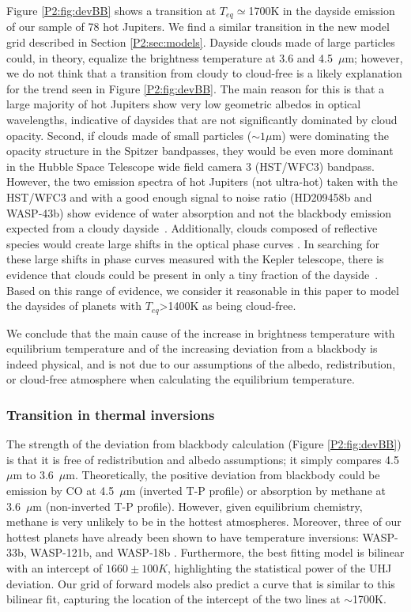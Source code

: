 Figure \ref{P2:fig:devBB} shows a transition at $T_{eq}\simeq$1700K in the dayside emission of our sample of 78 hot Jupiters. We find a similar transition in the new model grid described in Section \ref{P2:sec:models}. Dayside clouds made of large particles could, in theory, equalize the brightness temperature at 3.6 and 4.5~$\mu$m; however, we do not think that a transition from cloudy to cloud-free  is a likely explanation for the trend seen in Figure \ref{P2:fig:devBB}. The main reason for this is that a large majority of hot Jupiters show very low geometric albedos in optical wavelengths, indicative of daysides that are not significantly dominated by cloud opacity. Second, if clouds made of small particles ($\sim1\mu$m) were dominating the opacity structure in the Spitzer bandpasses, they would be even more dominant in the Hubble Space Telescope wide field camera 3 (HST/WFC3) bandpass. However, the two emission spectra of hot Jupiters (not ultra-hot) taken with the HST/WFC3 and with a good enough signal to noise ratio (HD209458b and WASP-43b) show evidence of water absorption and not the blackbody emission  expected from a cloudy dayside~\citep{Line2016, Stevenson2014b}. Additionally, clouds composed of reflective species would create large shifts in the optical phase curves \citet{Shporer2015}. In searching for these large shifts in phase curves measured with the Kepler telescope, there is evidence that clouds could be present in only a tiny fraction of the dayside~\citep{Parmentier2016}. Based on this range of evidence, we consider it reasonable in this paper to model the daysides of planets with $T_{eq}$>1400K as being
cloud-free.%

We conclude that the main cause of the increase in brightness temperature with equilibrium temperature and of the increasing deviation from a blackbody is indeed physical, and is not due to our assumptions of the albedo, redistribution, or cloud-free atmosphere when calculating the equilibrium temperature.

\subsubsection{Transition in thermal inversions}

The strength of the deviation from blackbody calculation (Figure \ref{P2:fig:devBB}) is that it is free of redistribution and albedo assumptions; it simply compares 4.5~$\mu$m to 3.6~$\mu$m. Theoretically, the positive deviation from blackbody could be emission by CO at 4.5~$\mu$m (inverted T-P profile) or absorption by methane at 3.6~$\mu$m (non-inverted T-P profile). However, given equilibrium chemistry, methane is very unlikely to be in the hottest atmospheres. Moreover, three of our hottest planets have already been shown to have temperature inversions: WASP-33b, WASP-121b, and WASP-18b \citep{Haynes2015, vonEssen2015, Evans2017, Arcangeli2018, Kreidberg2018}. Furthermore, the best fitting model is bilinear with an intercept of $1660\pm100K$, highlighting the statistical power of the UHJ deviation. Our grid of forward models also predict a curve that is similar to this bilinear fit, capturing the location of the intercept of the two lines at $\sim$1700K.

